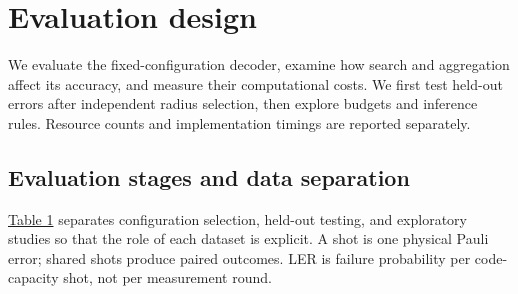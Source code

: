 \documentclass[aps,prapplied,reprint,superscriptaddress,amsmath,amssymb,floatfix,nofootinbib]{revtex4-2}
\begin{document}
\section{Evaluation design}\label{iii.-evaluation-design}

We evaluate the fixed-configuration decoder, examine how search and
aggregation affect its accuracy, and measure their computational costs.
We first test held-out errors after independent radius selection, then
explore budgets and inference rules. Resource counts and implementation
timings are reported separately.

\subsection{Evaluation stages and data
separation}\label{a.-evaluation-stages-and-data-separation}

\hyperref[tab:1]{Table 1} separates configuration selection, held-out testing, and
exploratory studies so that the role of each dataset is explicit. A shot
is one physical Pauli error; shared shots produce paired outcomes. LER
is failure probability per code-capacity shot, not per measurement
round.
\end{document}
